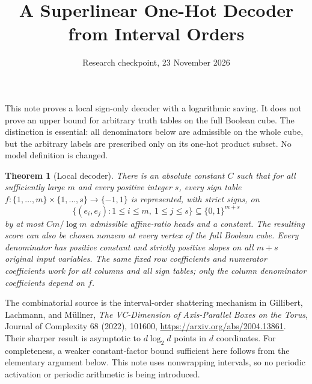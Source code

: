 \documentclass[11pt]{article}
\title{A Superlinear One-Hot Decoder from Interval Orders}
\author{Research checkpoint, 23 November 2026}
\date{}
\newtheorem{theorem}{Theorem}
\newcommand{\1}{\mathbf 1}
\begin{document}
\maketitle

This note proves a local sign-only decoder with a logarithmic saving. It does
not prove an upper bound for arbitrary truth tables on the full Boolean cube.
The distinction is essential: all denominators below are admissible on the
whole cube, but the arbitrary labels are prescribed only on its one-hot
product subset. No model definition is changed.

\begin{theorem}[Local decoder]
There is an absolute constant $C$ such that for all sufficiently large $m$
and every positive integer $s$, every sign table
$f:\{1,\ldots,m\}\times\{1,\ldots,s\}\to\{-1,1\}$ is represented, with
strict signs, on
\[
 \{(e_i,e_j):1\leq i\leq m,\ 1\leq j\leq s\}\subseteq\{0,1\}^{m+s}
\]
by at most $Cm/\log m$ admissible affine-ratio heads and a constant.
The resulting score can also be chosen nonzero at every vertex of the full
Boolean cube. Every denominator has positive constant and strictly positive slopes on all
$m+s$ original input variables. The same fixed row coefficients and numerator coefficients work for
all columns and all sign tables; only the column denominator coefficients
depend on $f$.
\end{theorem}

The combinatorial source is the interval-order shattering mechanism in
Gillibert, Lachmann, and M\"ullner,
\emph{The VC-Dimension of Axis-Parallel Boxes on the Torus},
Journal of Complexity 68 (2022), 101600,
\url{https://arxiv.org/abs/2004.13861}.
Their sharper result is asymptotic to $d\log_2 d$ points in $d$ coordinates.
For completeness, a weaker constant-factor bound sufficient here follows
from the elementary argument below. This note uses nonwrapping intervals,
so no periodic activation or periodic arithmetic is being introduced.
\end{document}
